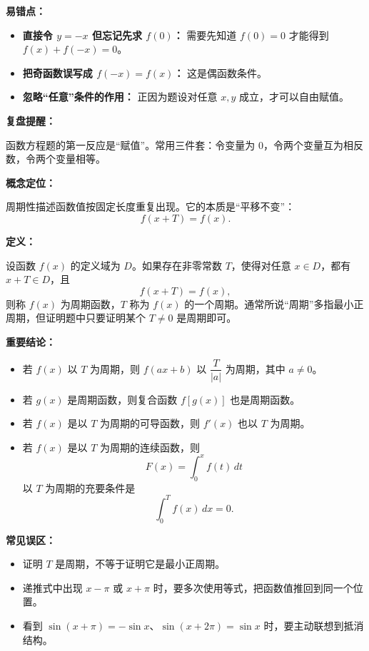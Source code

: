 \begin{mistakeBox}
\textbf{易错点：}

\begin{itemize}
  \item \textbf{直接令 \(y=-x\) 但忘记先求 \(f(0)\)：} 需要先知道 \(f(0)=0\) 才能得到 \(f(x)+f(-x)=0\)。
  \item \textbf{把奇函数误写成 \(f(-x)=f(x)\)：} 这是偶函数条件。
  \item \textbf{忽略“任意”条件的作用：} 正因为题设对任意 \(x,y\) 成立，才可以自由赋值。
\end{itemize}

\textbf{复盘提醒：}

函数方程题的第一反应是“赋值”。常用三件套：令变量为 \(0\)，令两个变量互为相反数，令两个变量相等。
\end{mistakeBox}

\par

\begin{knowledgeBox}
\textbf{概念定位：}

周期性描述函数值按固定长度重复出现。它的本质是“平移不变”：
\[
f(x+T)=f(x).
\]

\textbf{定义：}

设函数 \(f(x)\) 的定义域为 \(D\)。如果存在非零常数 \(T\)，使得对任意 \(x\in D\)，都有 \(x+T\in D\)，且
\[
f(x+T)=f(x),
\]
则称 \(f(x)\) 为周期函数，\(T\) 称为 \(f(x)\) 的一个周期。通常所说“周期”多指最小正周期，但证明题中只要证明某个 \(T\ne0\) 是周期即可。

\textbf{重要结论：}

\begin{itemize}
  \item 若 \(f(x)\) 以 \(T\) 为周期，则 \(f(ax+b)\) 以 \(\dfrac{T}{|a|}\) 为周期，其中 \(a\ne0\)。
  \item 若 \(g(x)\) 是周期函数，则复合函数 \(f[g(x)]\) 也是周期函数。
  \item 若 \(f(x)\) 是以 \(T\) 为周期的可导函数，则 \(f'(x)\) 也以 \(T\) 为周期。
  \item 若 \(f(x)\) 是以 \(T\) 为周期的连续函数，则
  \[
  F(x)=\int_0^x f(t)\,dt
  \]
  以 \(T\) 为周期的充要条件是
  \[
  \int_0^T f(x)\,dx=0.
  \]
\end{itemize}

\textbf{常见误区：}

\begin{itemize}
  \item 证明 \(T\) 是周期，不等于证明它是最小正周期。
  \item 递推式中出现 \(x-\pi\) 或 \(x+\pi\) 时，要多次使用等式，把函数值推回到同一个位置。
  \item 看到 \(\sin(x+\pi)=-\sin x\)、\(\sin(x+2\pi)=\sin x\) 时，要主动联想到抵消结构。
\end{itemize}
\end{knowledgeBox}

